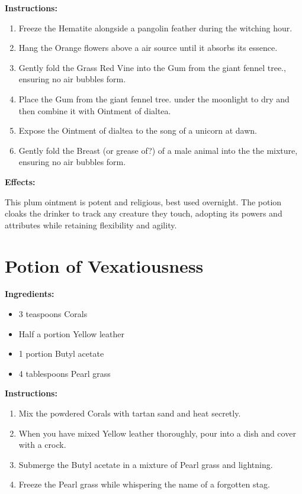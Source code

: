 \documentclass{article}
\begin{document}
\textbf{Instructions:}

\begin{enumerate}
  \item Freeze the Hematite alongside a pangolin feather during the witching hour.
  \item Hang the Orange flowers above a air source until it absorbs its essence.
  \item Gently fold the Grass Red Vine into the Gum from the giant fennel tree., ensuring no air bubbles form.
  \item Place the Gum from the giant fennel tree. under the moonlight to dry and then combine it with Ointment of dialtea.
  \item Expose the Ointment of dialtea to the song of a unicorn at dawn.
  \item Gently fold the Breast (or grease of?) of a male animal into the the mixture, ensuring no air bubbles form.
\end{enumerate}

\textbf{Effects:}

This plum ointment is potent and religious, best used overnight. The potion cloaks the drinker to track any creature they touch, adopting its powers and attributes while retaining flexibility and agility.

\newpage
\section*{Potion of Vexatiousness}

\textbf{Ingredients:}

\begin{itemize}
  \item 3 teaspoons Corals
  \item Half a portion Yellow leather
  \item 1 portion Butyl acetate
  \item 4 tablespoons Pearl grass
\end{itemize}

\textbf{Instructions:}

\begin{enumerate}
  \item Mix the powdered Corals with tartan sand and heat secretly.
  \item When you have mixed Yellow leather thoroughly, pour into a dish and cover with a crock.
  \item Submerge the Butyl acetate in a mixture of Pearl grass and lightning.
  \item Freeze the Pearl grass while whispering the name of a forgotten stag.
\end{enumerate}
\end{document}
